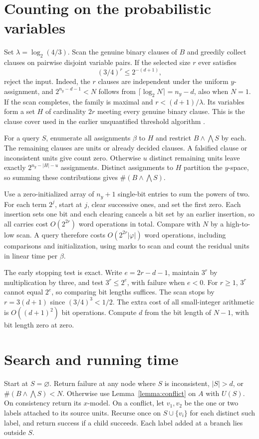 \documentclass[11pt,a4paper]{amsart}
\newcommand{\size}{\lvert\varphi\rvert}
\newcommand{\countsat}[1]{\#(#1)}
\begin{document}
\section{Counting on the probabilistic variables}
Set \(\lambda=\log_2(4/3)\). Scan the genuine binary clauses of \(B\) and greedily collect clauses on pairwise disjoint variable pairs. If the selected size \(r\) ever satisfies
\[
 (3/4)^r\le 2^{-(d+1)},
\]
reject the input. Indeed, the \(r\) clauses are independent under the uniform \(y\)-assignment, and \(2^{n_y-d-1}<N\) follows from \(\lceil\log_2 N\rceil=n_y-d\), also when \(N=1\). If the scan completes, the family is maximal and \(r<(d+1)/\lambda\). Its variables form a set \(H\) of cardinality \(2r\) meeting every genuine binary clause. This is the clause cover used in the earlier unquantified threshold algorithm \cite[Theorem~3.1]{aw}.

For a query \(S\), enumerate all assignments \(\beta\) to \(H\) and restrict \(B\wedge\bigwedge S\) by each. The remaining clauses are units or already decided clauses. A falsified clause or inconsistent units give count zero. Otherwise \(u\) distinct remaining units leave exactly \(2^{n_y-|H|-u}\) assignments. Distinct assignments to \(H\) partition the \(y\)-space, so summing these contributions gives \(\countsat{B\wedge\bigwedge S}\).

Use a zero-initialized array of \(n_y+1\) single-bit entries to sum the powers of two. For each term \(2^j\), start at \(j\), clear successive ones, and set the first zero. Each insertion sets one bit and each clearing cancels a bit set by an earlier insertion, so all carries cost \(O(2^{2r})\) word operations in total. Compare with \(N\) by a high-to-low scan. A query therefore costs \(O(2^{2r}\size)\) word operations, including comparisons and initialization, using marks to scan and count the residual units in linear time per \(\beta\).

The early stopping test is exact. Write \(e=2r-d-1\), maintain \(3^r\) by multiplication by three, and test \(3^r\le 2^e\), with failure when \(e<0\). For \(r\ge1\), \(3^r\) cannot equal \(2^e\), so comparing bit lengths suffices. The scan stops by \(r=3(d+1)\) since \((3/4)^3<1/2\). The extra cost of all small-integer arithmetic is \(O((d+1)^2)\) bit operations. Compute \(d\) from the bit length of \(N-1\), with bit length zero at zero.

\section{Search and running time}
Start at \(S=\varnothing\). Return failure at any node where \(S\) is inconsistent, \(|S|>d\), or \(\countsat{B\wedge\bigwedge S}<N\). Otherwise use Lemma~\ref{lemma:conflict} on \(A\) with \(U(S)\). On consistency return its \(x\)-model. On a conflict, let \(v_1,v_2\) be the one or two labels attached to its source units. Recurse once on \(S\cup\{v_i\}\) for each distinct such label, and return success if a child succeeds. Each label added at a branch lies outside \(S\).
\end{document}
